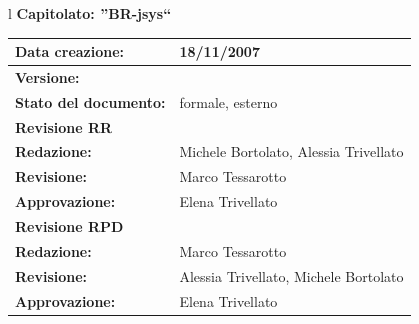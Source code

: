 \documentclass[11pt,titlepage,a4paper]{report}
\begin{document}
\begin{center}
\thispagestyle{plain}
\begin{table}[htbp]
\large{
\begin{tabular}{l}
\Large{\textbf{\textsf{Capitolato: ''BR-jsys``}}} \\
\begin{tabular}{||p{6cm}||p{6cm}||} \hline
\textbf{Data creazione:} & 18/11/2007 \\ \hline
\textbf{Versione:} & \lv \\ \hline
\textbf{Stato del documento:} & formale, esterno \\ \hline
\textbf{Revisione RR} &    \\ \hline
\textbf{Redazione:} & Michele Bortolato, Alessia Trivellato \\ \hline
\textbf{Revisione:} &   Marco Tessarotto \\ \hline
\textbf{Approvazione:}  & Elena Trivellato\\ \hline
\textbf{Revisione RPD} & \\ \hline 
\textbf{Redazione:} & Marco Tessarotto \\ \hline
\textbf{Revisione:} &  Alessia Trivellato, Michele Bortolato \\ \hline
\textbf{Approvazione:}  & Elena Trivellato \\ \hline
\end{tabular} \\
\end{tabular}
}
\end{table}


\end{center}
\end{document}
